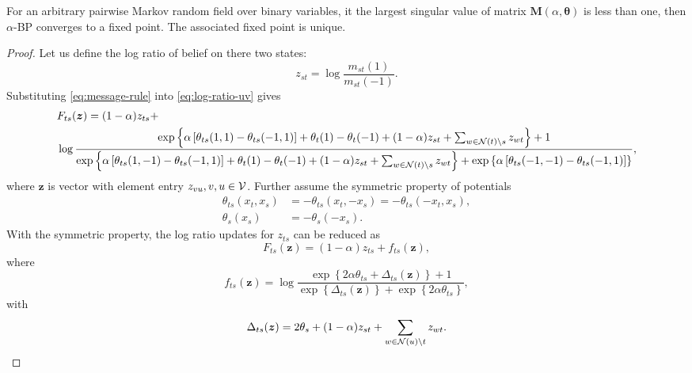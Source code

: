 \documentclass[conference,onecolumn]{IEEEtran}
\begin{document}
\begin{thm}\label{thm:normd}
  For an arbitrary pairwise Markov random field over binary variables,
  it the largest singular value of matrix $\bm{M}(\alpha, \bm{\theta})$ is less than one,
  then $\alpha$-BP converges to a fixed point. The associated fixed
  point is unique.
\end{thm}

\begin{proof}

  Let us define the log ratio of belief on there two states:
  \begin{equation}\label{eq:log-ratio-uv}
    z_{st} = \log\frac{m_{st}(1)}{m_{st}(-1)}.
  \end{equation}
  Substituting \eqref{eq:message-rule} into \eqref{eq:log-ratio-uv} gives
  \begin{align}
    &F_{ts}(\bm{z}) = (1- \alpha)z_{ts} + \\
    &\log\frac{\exp\left\{ \alpha\left[ \theta_{ts}(1,1) - \theta_{ts}(-1,1) \right] + \theta_t(1) - \theta_t(-1) + (1 - \alpha)z_{st} + \sum_{w\in \mathcal{N}(t)\backslash s} z_{wt} \right\}+1}
      {\exp\left\{ \alpha\left[ \theta_{ts}(1,-1) - \theta_{ts}(-1,1) \right] + \theta_t(1) - \theta_t(-1) + (1 - \alpha)z_{st} + \sum_{w\in \mathcal{N}(t)\backslash s} z_{wt} \right\} +
      \exp\left\{ \alpha\left[ \theta_{ts}(-1,-1) - \theta_{ts}(-1,1) \right] \right\}},
  \end{align}
  where $\bm{z}$ is vector with element entry $z_{vu}, v,u \in \mathcal{V}$.
  Further assume the symmetric property of potentials
  \begin{align}
    \theta_{ts}(x_t, x_s) &= -\theta_{ts}(x_t, -x_s) = -\theta_{ts}(-x_t, x_s), \\
    \theta_{s}(x_s) &= - \theta_s(-x_s).
  \end{align}
  With the symmetric property, the log ratio updates for $z_{ts}$ can be reduced as
  \begin{equation}\label{eq:ratio-update}
    F_{ts}(\bm{z}) = (1-\alpha) z_{ts} + f_{ts}(\bm{z}),
  \end{equation}
  where
  \begin{equation}
    f_{ts}(\bm{z}) = \log\frac{\exp\left\{ 2 \alpha \theta_{ts} + \Delta_{ts}(\bm{z}) \right\}+1}
    {\exp\left\{ \Delta_{ts}(\bm{z}) \right\} +
      \exp\left\{ 2 \alpha \theta_{ts} \right\}},
  \end{equation}
  with
  \begin{equation}
    \Delta_{ts}(\bm{z}) = 2 \theta_s + (1 - \alpha) z_{st} + \sum_{w\in \mathcal{N}(u)\backslash t} z_{wt}.
  \end{equation}


\end{proof}
\end{document}
